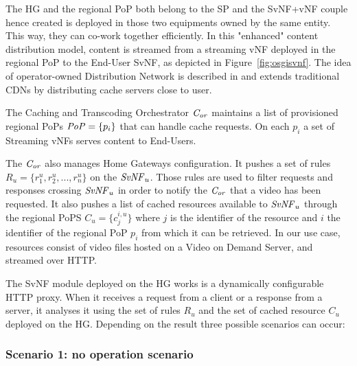 The HG and the regional PoP both belong to the SP and the SvNF+vNF couple hence created is deployed in those two equipments owned by the same entity. This way, they can co-work together efficiently. In this "enhanced" content distribution model, content is streamed from a streaming vNF deployed in the regional PoP to the End-User SvNF, as depicted in Figure~\ref{fig:osgisvnf}.
The idea of operator-owned Distribution Network is described in \cite{spagna_design_2013} and extends traditional CDNs by distributing cache servers close to user.

The Caching and Transcoding Orchestrator  $\mathit{C_{or}}$ maintains a list of provisioned regional PoPs \(\mathit{PoP}=\{p_{i}\}\) that can handle cache requests. On each $p_{i}$ a set of Streaming vNFs serves content to End-Users.

The $\mathit{C_{or}}$ also manages Home Gateways configuration. It pushes a set of rules \(R_{u}=\{r^{u}_{1},r^{u}_{2},...,r^{u}_{n}\}\) on the $\mathit{SvNF}_{u}$. 
Those rules are used to filter requests and responses crossing $\mathit{SvNF}_{u}$ in order to notify the $\mathit{C_{or}}$ that a video has been requested.
It also pushes a list of cached resources available to $\mathit{SvNF}_{u}$ through the regional PoPS $C_{u}=\{c^{i,u}_{j} \}$ where $j$ is the identifier of the resource and $i$ the identifier of the regional PoP $p_{i}$ from which it can be retrieved. In our use case, resources consist of video files hosted on a Video on Demand Server, and streamed over HTTP.

The SvNF module deployed on the HG works is a dynamically configurable HTTP proxy.
When it receives a request from a client or a response from a server, it analyses it using the set of rules \(R_{u}\) and the set of cached resource $C_{u}$ deployed on the HG.
Depending on the result three possible scenarios can occur:


\subsubsection*{Scenario 1: no operation scenario}\label{noop}

